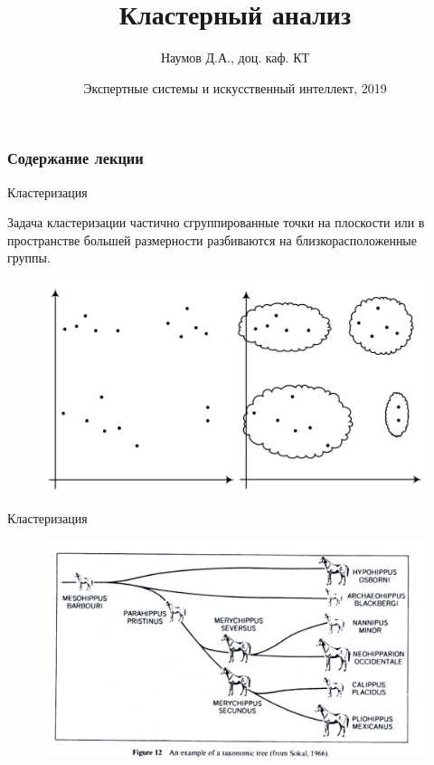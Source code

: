 \documentclass{beamer}
\title[Artifical Intelligence]{Кластерный анализ}
\author{Наумов Д.А., доц. каф. КТ}
\date[04.12.2019] {Экспертные системы и искусственный интеллект, 2019}
\begin{document}
\begin{frame}
  \titlepage
\end{frame}
  
\begin{frame}
  \frametitle{Содержание лекции}
  \tableofcontents  
\end{frame}

\begin{frame}{Кластеризация}
\begin{block}{Задача кластеризации}
частично сгруппированные точки на плоскости или в пространстве большей размерности разбиваются на близкорасположенные группы.
\end{block}
\begin{figure}[h]
\centering
\includegraphics[scale=0.4]{images/lec07-pic01.png}
\end{figure}
\end{frame}

\begin{frame}{Кластеризация}
\begin{figure}[h]
\centering
\includegraphics[scale=0.4]{images/lec07-pic06.png}
\end{figure}
\end{frame}
\end{document}

